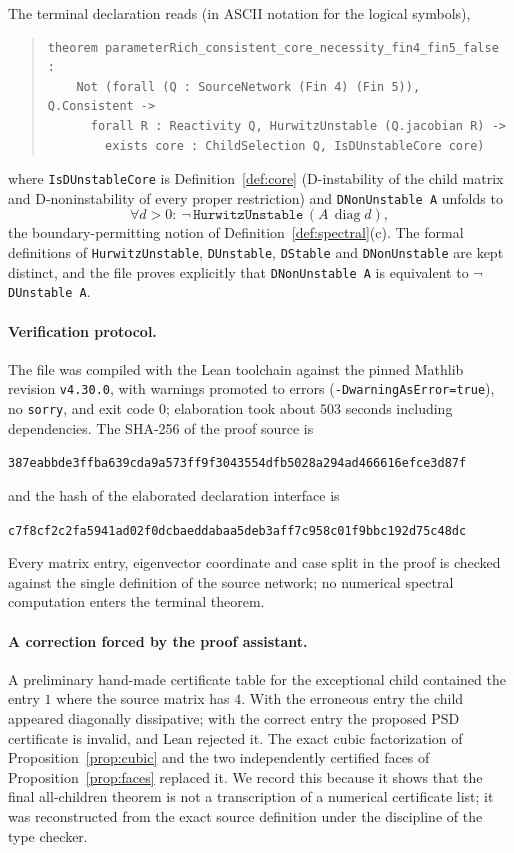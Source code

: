 \documentclass[11pt,a4paper]{article}
\theoremstyle{definition}
\theoremstyle{remark}
\newcommand{\diag}{\operatorname{diag}}
\newcommand{\lean}[1]{\texttt{#1}}
\begin{document}
The terminal declaration reads (in ASCII notation for the logical symbols),
\begin{quote}\small
\begin{verbatim}
theorem parameterRich_consistent_core_necessity_fin4_fin5_false :
    Not (forall (Q : SourceNetwork (Fin 4) (Fin 5)), Q.Consistent ->
      forall R : Reactivity Q, HurwitzUnstable (Q.jacobian R) ->
        exists core : ChildSelection Q, IsDUnstableCore core)
\end{verbatim}
\end{quote}
\begingroup\sloppy where \lean{IsDUnstableCore} is Definition~\ref{def:core} (D-instability of the child matrix and D-noninstability of every proper restriction) and \lean{DNonUnstable A} unfolds to
\[
\forall d>0:\ \neg\,\lean{HurwitzUnstable}\,(A\,\diag d),
\]
the boundary-permitting notion of Definition~\ref{def:spectral}(c). The formal definitions of \lean{HurwitzUnstable}, \lean{DUnstable}, \lean{DStable} and \lean{DNonUnstable} are kept distinct, and the file proves explicitly that \lean{DNonUnstable A} is equivalent to $\neg$\lean{DUnstable A}.\par\endgroup

\paragraph{Verification protocol.} The file was compiled with the Lean toolchain  against the pinned Mathlib revision \lean{v4.30.0}, with warnings promoted to errors (\lean{-DwarningAsError=true}), no \lean{sorry}, and exit code $0$; elaboration took about $503$ seconds including dependencies. The SHA-256 of the proof source is
\begin{center}\scriptsize\texttt{387eabbde3ffba639cda9a573ff9f3043554dfb5028a294ad466616efce3d87f}\end{center}
and the hash of the elaborated declaration interface is
\begin{center}\scriptsize\texttt{c7f8cf2c2fa5941ad02f0dcbaeddabaa5deb3aff7c958c01f9bbc192d75c48dc}\end{center}
Every matrix entry, eigenvector coordinate and case split in the proof is checked against the single definition of the source network; no numerical spectral computation enters the terminal theorem.

\paragraph{A correction forced by the proof assistant.} A preliminary hand-made certificate table for the exceptional child contained the entry $1$ where the source matrix has $4$. With the erroneous entry the child appeared diagonally dissipative; with the correct entry the proposed PSD certificate is invalid, and Lean rejected it. The exact cubic factorization of Proposition~\ref{prop:cubic} and the two independently certified faces of Proposition~\ref{prop:faces} replaced it. We record this because it shows that the final all-children theorem is not a transcription of a numerical certificate list; it was reconstructed from the exact source definition under the discipline of the type checker.
\end{document}
